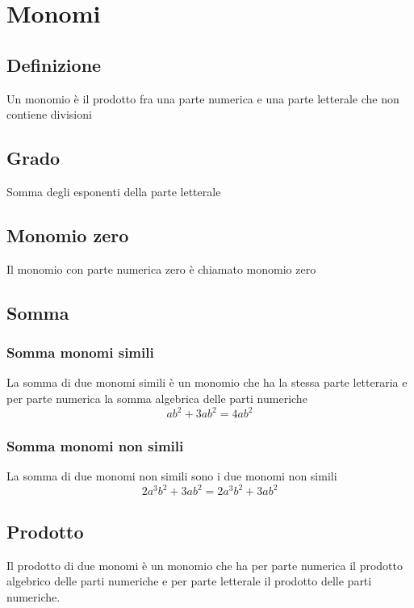 \chapter{Monomi}
\section{Definizione}
Un monomio è il prodotto fra una parte numerica e una parte letterale che non contiene divisioni
\section{Grado} 
Somma degli esponenti della parte letterale
\section{Monomio zero}
Il monomio con parte numerica zero è chiamato monomio zero
\section{Somma}
\subsection{Somma monomi simili}
La somma di due monomi simili è un monomio che ha la stessa parte letteraria e per parte numerica la somma algebrica delle parti numeriche
\begin{equation}
ab^2+3ab^2=4ab^2
\end{equation}
\subsection{Somma monomi non simili}
La somma di due monomi non simili  sono i due monomi non simili
\begin{equation}
2a^3b^2+3ab^2=2a^3b^2+3ab^2
\end{equation}
\section{Prodotto}
Il prodotto di due monomi è un monomio che ha per parte numerica il prodotto algebrico delle parti numeriche e per parte letterale il prodotto delle parti numeriche.